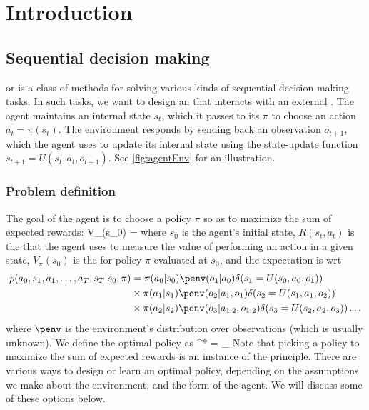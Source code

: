 
\chapter{Introduction}


\section{Sequential decision making}

or  is a class of methods for solving
various kinds of sequential decision making tasks.
In such tasks, we want to design an  
that interacts with an external .
  The agent maintains an internal state $s_t$, which it passes to its 
  $\pi$ to choose an action $a_{t}=\pi(s_t)$.
  The environment responds by sending back an observation $o_{t+1}$,
  which the agent uses to update its internal state using the state-update
  function $s_{t+1}=U(s_t,a_{t},o_{t+1})$.
  See \cref{fig:agentEnv} for an illustration.


\subsection{Problem definition}
  
The goal of the agent is to choose a policy $\pi$ so as to
maximize the sum of expected rewards:
\be
V_{\pi}(s_0) = 
\label{eqn:valueFn}
\ee
where $s_0$ is the agent's initial state,
$R(s_t,a_t)$ is the  that the agent
uses to measure the value of performing an action in a given state,
$V_{\pi}(s_0)$ is the  for  policy $\pi$ evaluated at $s_0$,
and the expectation is wrt
\begin{align}
p(a_0,s_1,a_1,\ldots,a_T,s_T|s_0,\pi)
&= \pi(a_0|s_0) \penv(o_1|a_0) \delta(s_1=U(s_0,a_0,o_1))  \\
& \times \pi(a_1|s_1) \penv(o_2|a_1,o_1) \delta(s_2=U(s_1,a_1,o_2)) \\
& \times \pi(a_2|s_2) \penv(o_3|a_{1:2},o_{1:2}) \delta(s_3=U(s_2,a_2,o_3)) 
\ldots
\label{eqn:distrib}
\end{align}
where $\penv$ is the environment's distribution over observations 
(which  is usually  unknown).
We define the optimal policy as
\be
\pi^* = \arg\max_{\pi} 
\ee
Note that picking a policy to maximize the sum of expected rewards is an instance
of the   principle.
There are  various ways to design or learn an optimal policy,
depending on the assumptions we make about the environment,
and the form of the agent. We will discuss some of these options below.

